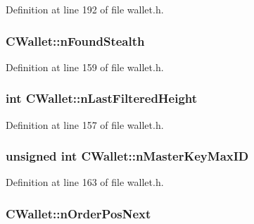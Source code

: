 Definition at line 192 of file wallet.\+h.

\hypertarget{class_c_wallet_a8bf6ef405ab6ad3c38a895df54c365d9}{}
\subsubsection[{n\+Found\+Stealth}]{ C\+Wallet\+::n\+Found\+Stealth}\label{class_c_wallet_a8bf6ef405ab6ad3c38a895df54c365d9}


Definition at line 159 of file wallet.\+h.

\hypertarget{class_c_wallet_a5a2454436e420bece1c747a3b0b09a87}{}
\subsubsection[{n\+Last\+Filtered\+Height}]{\setlength{\rightskip}{0pt plus 5cm}int C\+Wallet\+::n\+Last\+Filtered\+Height}\label{class_c_wallet_a5a2454436e420bece1c747a3b0b09a87}


Definition at line 157 of file wallet.\+h.

\hypertarget{class_c_wallet_aecfc6e4a6ea958ec369ca77d790271e3}{}
\subsubsection[{n\+Master\+Key\+Max\+I\+D}]{\setlength{\rightskip}{0pt plus 5cm}unsigned int C\+Wallet\+::n\+Master\+Key\+Max\+I\+D}\label{class_c_wallet_aecfc6e4a6ea958ec369ca77d790271e3}


Definition at line 163 of file wallet.\+h.

\hypertarget{class_c_wallet_af56cb17b19742506fc8d9449fc60884e}{}
\subsubsection[{n\+Order\+Pos\+Next}]{ C\+Wallet\+::n\+Order\+Pos\+Next}\label{class_c_wallet_af56cb17b19742506fc8d9449fc60884e}


